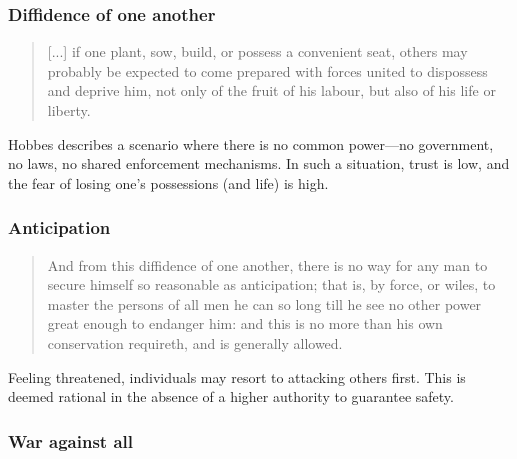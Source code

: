         \subsubsection{Diffidence of one another}

            \begin{quote}
                [...] if one plant, sow, build, or possess a convenient seat, others may probably be expected to come prepared with forces united to dispossess and deprive him, not only of the fruit of his labour, but also of his life or liberty.
            \end{quote}

            \begin{remark}
                Hobbes describes a scenario where there is no common power—no government, no laws, no shared enforcement mechanisms. In such a situation, trust is low, and the fear of losing one’s possessions (and life) is high.
            \end{remark}

        \subsubsection{Anticipation}

            \begin{quote}
                And from this diffidence of one another, there is no way for any man to secure himself so reasonable as anticipation; that is, by force, or wiles, to master the persons of all men he can so long till he see no other power great enough to endanger him: and this is no more than his own conservation requireth, and is generally allowed.
            \end{quote}

            \begin{proposition}
                Feeling threatened, individuals may resort to attacking others first. This is deemed rational in the absence of a higher authority to guarantee safety.
            \end{proposition}

        \subsubsection{War against all}

